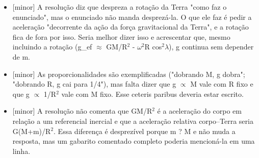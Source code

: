 \documentclass{article}%
\begin{document}
\begin{itemize}%
\item%
{[}minor{]} A resolução diz que despreza a rotação da Terra "como faz o enunciado", mas o enunciado não manda desprezá{-}la. O que ele faz é pedir a aceleração "decorrente da ação da força gravitacional da Terra", e a rotação fica de fora por isso. Seria melhor dizer isso e acrescentar que, mesmo incluindo a rotação (g\_ef $\approx$ GM/R$^2$ - $\omega$$^2$R cos$^2$$\lambda$), g continua sem depender de m.%
\item%
{[}minor{]} As proporcionalidades são exemplificadas ("dobrando M, g dobra"; "dobrando R, g cai para 1/4"), mas falta dizer que g $\propto$ M vale com R fixo e que g $\propto$ 1/R$^2$ vale com M fixo. Esse ceteris paribus deveria estar escrito.%
\item%
{[}minor{]} A resolução não comenta que GM/R$^2$ é a aceleração do corpo em relação a um referencial inercial e que a aceleração relativa corpo--Terra seria G(M+m)/R$^2$. Essa diferença é desprezível porque m ? M e não muda a resposta, mas um gabarito comentado completo poderia mencioná{-}la em uma linha.%
\end{itemize}%
\end{document}
